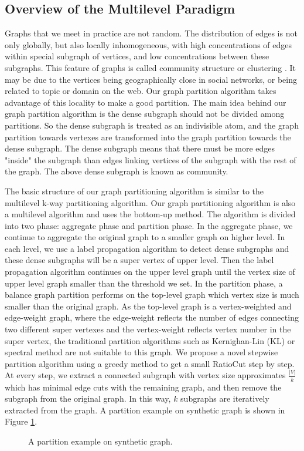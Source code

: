 \documentclass{acm_proc_article-sp}
\begin{document}
\subsection{Overview of the Multilevel Paradigm}
Graphs that we meet in practice are not random. The distribution of edges is not only globally, but also locally inhomogeneous, with high concentrations of edges within special subgraph of vertices, and low concentrations between these subgraphs. This feature of graphs is called community structure or clustering \cite{gn:community}. It may be due to the vertices being geographically close in social networks, or being related to topic or domain on the web. Our graph partition algorithm takes advantage of this locality to make a good partition. The main idea behind our graph partition algorithm is the dense subgraph should not be divided among partitions. So the dense subgraph is treated as an indivisible atom, and the graph partition towards vertexes are transformed into the graph partition towards the dense subgraph. The dense subgraph means that there must be more edges "inside" the subgraph than edges linking vertices of the subgraph with the rest of the graph. The above dense subgraph is known as community.
\par
The basic structure of our graph partitioning algorithm is similar to the multilevel k-way partitioning algorithm. Our graph partitioning algorithm is also a multilevel algorithm and uses the bottom-up method. The algorithm is divided into two phase: aggregate phase and partition phase. In the aggregate phase, we continue to aggregate the original graph to a smaller graph on higher level. In each level, we use a label propagation algorithm to detect dense subgraphs and these dense subgraphs will be a super vertex of upper level. Then the label propagation algorithm continues on the upper level graph until the vertex size of upper level graph smaller than the threshold we set. In the partition phase, a balance graph partition performs on the top-level graph which vertex size is much smaller than the original graph. As the top-level graph is a vertex-weighted and edge-weight graph, where the edge-weight reflects the number of edges connecting two different super vertexes and the vertex-weight reflects vertex number in the super vertex, the traditional partition algorithms such as Kernighan-Lin (KL) or spectral method are not suitable to this graph\cite{kl:partition, barnard:mrsb}. We propose a novel stepwise partition algorithm using a greedy method to get a small RatioCut step by step. At every step, we extract a connected subgraph with vertex size approximates $\frac{|V|}{k}$ which has minimal edge cuts with the remaining graph, and then remove the subgraph from the original graph. In this way, $k$ subgraphs are iteratively extracted from the graph. A partition example on synthetic graph is shown in Figure \ref{fig:partition example}.
\begin{figure}
\centering
{}
\caption{A partition example on synthetic graph.}
\label{fig:partition example}
\end{figure}
\end{document}
